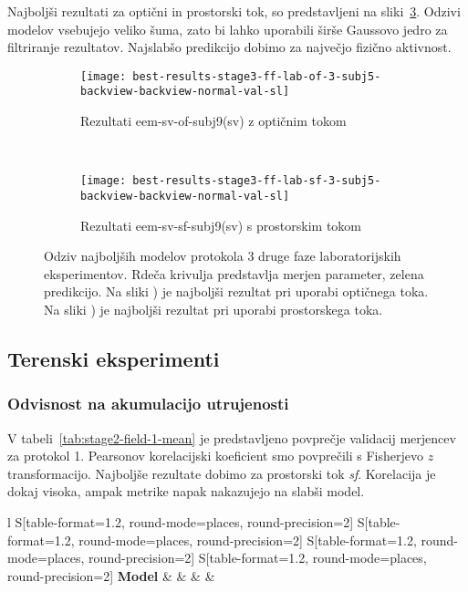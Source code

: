 Najboljši rezultati za optični in prostorski tok, so predstavljeni na sliki~\ref{fig:lab-3}. Odzivi modelov vsebujejo veliko šuma, zato bi lahko uporabili širše Gaussovo jedro za filtriranje rezultatov. Najslabšo predikcijo dobimo za največjo fizično aktivnost.

\begin{figure}[!htbp]
	\centering
	\begin{subfigure}[t]{0.45\columnwidth}
		\texttt{[image: best-results-stage3-ff-lab-of-3-subj5-backview-backview-normal-val-sl]}
		\caption{Rezultati eem-sv-of-subj9(sv) z optičnim tokom}
		\label{fig:lab-of-3}
	\end{subfigure}
	~
	\begin{subfigure}[t]{0.45\columnwidth}
		\texttt{[image: best-results-stage3-ff-lab-sf-3-subj5-backview-backview-normal-val-sl]}
		\caption{Rezultati eem-sv-sf-subj9(sv) s prostorskim tokom}
		\label{fig:lab-sf-3}
	\end{subfigure}
	\caption[Odziv SUBJ9 modelov protokola 3 druge faze laboratorijskih eksperimentov]{Odziv najboljših modelov protokola 3 druge faze laboratorijskih eksperimentov. Rdeča krivulja predstavlja merjen parameter, zelena predikcijo. Na sliki ) je najboljši rezultat pri uporabi optičnega toka. Na sliki ) je najboljši rezultat pri uporabi prostorskega toka.}
	\label{fig:lab-3}
\end{figure}

\subsection{Terenski eksperimenti}
\subsubsection{Odvisnost na akumulacijo utrujenosti}
V tabeli~\ref{tab:stage2-field-1-mean} je predstavljeno povprečje validacij merjencev za protokol 1. Pearsonov korelacijski koeficient \corr smo povprečili s Fisherjevo $z$ transformacijo. Najboljše rezultate dobimo za prostorski tok \textit{sf}. Korelacija je dokaj visoka, ampak metrike napak nakazujejo na slabši model.

\begin{table}[!htbp]
	\centering
	\begin{tabular}{l S[table-format=1.2, round-mode=places, round-precision=2] S[table-format=1.2, round-mode=places, round-precision=2] S[table-format=1.2, round-mode=places, round-precision=2] S[table-format=1.2, round-mode=places, round-precision=2]}
		\toprule
		\textbf{Model} & \thead{\corr} & \thead{\rae} & \thead{\rrse} & \thead{\nsv}\\
		\midrule
		\bottomrule
	\end{tabular}
	\caption[Povprečje validacij merjencev za protokol 1 2. faze terenskih eksperimentov]{Povprečje validacij merjencev za protokol 1 druge faze terenskih eksperimentov. Pearsonov korelacijski koeficient (CORR) smo povprečili s Fisherjevo $z$ transformacijo.}
	\label{tab:stage2-field-1-mean}
\end{table}

